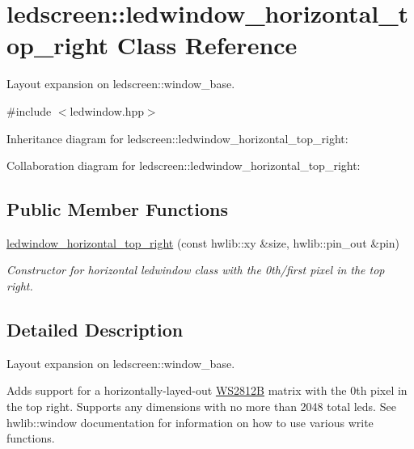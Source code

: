 \hypertarget{classledscreen_1_1ledwindow__horizontal__top__right}{}\section{ledscreen\+:\+:ledwindow\+\_\+horizontal\+\_\+top\+\_\+right Class Reference}
\label{classledscreen_1_1ledwindow__horizontal__top__right}


Layout expansion on ledscreen\+::window\+\_\+base.  




{\ttfamily \#include $<$ledwindow.\+hpp$>$}



Inheritance diagram for ledscreen\+:\+:ledwindow\+\_\+horizontal\+\_\+top\+\_\+right\+:


Collaboration diagram for ledscreen\+:\+:ledwindow\+\_\+horizontal\+\_\+top\+\_\+right\+:
\subsection*{Public Member Functions}
\begin{DoxyCompactItemize}
\item 
\hyperlink{classledscreen_1_1ledwindow__horizontal__top__right_a864a5836127de54c05fcce051c8bf93a}{ledwindow\+\_\+horizontal\+\_\+top\+\_\+right} (const hwlib\+::xy \&size, hwlib\+::pin\+\_\+out \&pin)
\begin{DoxyCompactList}\small\item\em Constructor for horizontal ledwindow class with the 0th/first pixel in the top right. \end{DoxyCompactList}\end{DoxyCompactItemize}


\subsection{Detailed Description}
Layout expansion on ledscreen\+::window\+\_\+base. 

Adds support for a horizontally-\/layed-\/out \hyperlink{classledscreen_1_1WS2812B}{W\+S2812B} matrix with the 0th pixel in the top right. Supports any dimensions with no more than 2048 total leds. See hwlib\+::window documentation for information on how to use various write functions. 

